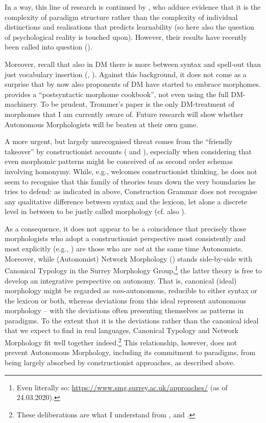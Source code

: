 \documentclass[output=paper]{langsci/langscibook}
\begin{document}
In a way, this line of research is continued by \citet{AckermanAckerman2013}, who adduce evidence that it is the complexity of paradigm structure rather than the complexity of individual distinctions and realisations that predicts learnability (so here also the question of psychological reality is touched upon). However, their results have recently been called into question (\citealt{JohnsonEtAlPreprint}).

Moreover, recall that also in DM there is more between syntax and spell-out than just vocabulary insertion (, ). Against this background, it does not come as a surprise that by now also proponents of DM have started to embrace morphomes. \citet{Trommer2016} provides a “postsyntactic morphome cookbook”, not even using the full DM-machinery. To be prudent, Trommer’s paper is the only DM-treatment of morphomes that I am currently aware of. Future research will show whether Autonomous Morphologists will be beaten at their own game.

A more urgent, but largely unrecognised threat comes from the “friendly take\-over” by constructionist accounts ( and ), especially when considering that even morphomic patterns might be conceived of as second order schemas involving homonymy. While, e.g., \textcites[]{Spencer2001}[84--86]{Spencer2004} welcomes constructionist thinking, he does not seem to recognise that this family of theories tears down the very boundaries he tries to defend: as indicated in  above, Construction Grammar does not recognise any qualitative difference between syntax and the lexicon, let alone a discrete level in between to be justly called morphology (cf. also \cites[5]{Goldberg2006}[17]{Goldberg2013}[1]{HoffmannHoffmann2013}).

As a consequence, it does not appear to be a coincidence that precisely those morphologists who adopt a constructionist perspective most consistently and most explicitly (e.g., \citealt{Booij2010}) are those who are \textit{not} at the same time Autonomists. Moreover, while (Autonomist) Network Morphology (\citealt{BrownBrown2012}) stands side-by-side with Canonical Typology in the Surrey Morphology Group,\footnote{Even literally so: \url{https://www.smg.surrey.ac.uk/approaches/} (as of 24.03.2020).} the latter theory is free to develop an integrative perspective on autonomy. That is, canonical (ideal) morphology might be regarded as \textit{non}{}-autonomous, reducible to either syntax or the lexicon or both, whereas deviations from this ideal represent autonomous morphology – with the deviations often presenting themselves as patterns in paradigms. To the extent that it is the deviations rather than the canonical ideal that we expect to find in real languages, Canonical Typology and Network Morphology fit well together indeed.\footnote{These deliberations are what I understand from \citet{GagliaGaglia2016}, \citet{Hippisley2017} and \citet{Herce2020b}.} This relationship, however, does not prevent Autonomous Morphology, including its commitment to paradigms, from being largely absorbed by constructionist approaches, as described above.
\end{document}
